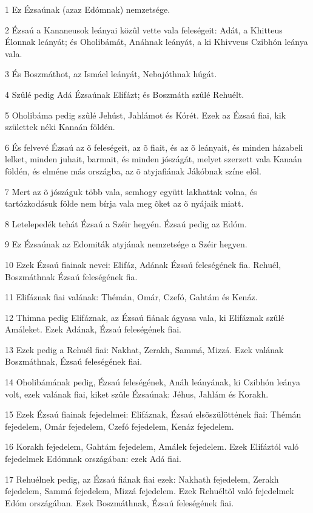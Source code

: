 \par 1 Ez Ézsaúnak (azaz Edómnak) nemzetsége.
\par 2 Ézsaú a Kananeusok leányai közûl vette vala feleségeit: Adát, a Khitteus Élonnak leányát; és Oholibámát, Anáhnak leányát, a ki Khivveus Czibhón leánya vala.
\par 3 És Boszmáthot, az Ismáel leányát, Nebajóthnak húgát.
\par 4 Szûlé pedig Adá Ézsaúnak Elifázt; és Boszmáth szûlé Rehuélt.
\par 5 Oholibáma pedig szûlé Jehúst, Jahlámot és Kórét. Ezek az Ézsaú fiai, kik születtek néki Kanaán földén.
\par 6 És felvevé Ézsaú az õ feleségeit, az õ fiait, és az õ leányait, és minden házabeli lelket, minden juhait, barmait, és minden jószágát, melyet szerzett vala Kanaán földén, és elméne más országba, az õ atyjafiának Jákóbnak színe elõl.
\par 7 Mert az õ jószáguk több vala, semhogy együtt lakhattak volna, és tartózkodásuk földe nem bírja vala meg õket az õ nyájaik miatt.
\par 8 Letelepedék tehát Ézsaú a Széir hegyén. Ézsaú pedig az Edóm.
\par 9 Ez Ézsaúnak az Edomiták atyjának nemzetsége a Széir hegyen.
\par 10 Ezek Ézsaú fiainak nevei: Elifáz, Adának Ézsaú feleségének fia. Rehuél, Boszmáthnak Ézsaú feleségének fia.
\par 11 Elifáznak fiai valának: Thémán, Omár, Czefó, Gahtám és Kenáz.
\par 12 Thimna pedig Elifáznak, az Ézsaú fiának ágyasa vala, ki Elifáznak szûlé Amáleket. Ezek Adának, Ézsaú feleségének fiai.
\par 13 Ezek pedig a Rehuél fiai: Nakhat, Zerakh, Sammá, Mizzá. Ezek valának Boszmáthnak, Ézsaú feleségének fiai.
\par 14 Oholibámának pedig, Ézsaú feleségének, Anáh leányának, ki Czibhón leánya volt, ezek valának fiai, kiket szûle Ézsaúnak: Jéhus, Jahlám és Korakh.
\par 15 Ezek Ézsaú fiainak fejedelmei: Elifáznak, Ézsaú elsõszülöttének fiai: Thémán fejedelem, Omár fejedelem, Czefó fejedelem, Kenáz fejedelem.
\par 16 Korakh fejedelem, Gahtám fejedelem, Amálek fejedelem. Ezek Elifáztól való fejedelmek Edómnak országában: ezek Adá fiai.
\par 17 Rehuélnek pedig, az Ézsaú fiának fiai ezek: Nakhath fejedelem, Zerakh fejedelem, Sammá fejedelem, Mizzá fejedelem. Ezek Rehuéltõl való fejedelmek Edóm országában. Ezek Boszmáthnak, Ézsaú feleségének fiai.
